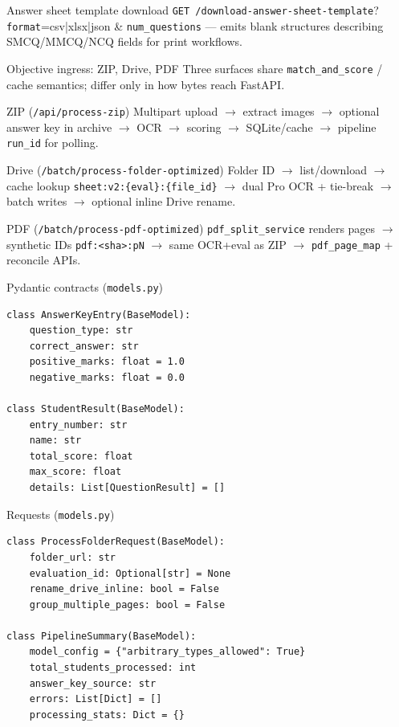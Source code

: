 \documentclass[aspectratio=169]{beamer}
\begin{document}
\begin{frame}{Answer sheet template download}
  \small
  \texttt{GET /download-answer-sheet-template}? \texttt{format}=csv|xlsx|json \& \texttt{num\_questions} --- emits blank structures describing SMCQ/MMCQ/NCQ fields for print workflows.
\end{frame}

\begin{frame}{Objective ingress: ZIP, Drive, PDF}
  \footnotesize
  Three surfaces share \texttt{match\_and\_score} / cache semantics; differ only in how bytes reach FastAPI.
\end{frame}

\begin{frame}{ZIP (\texttt{/api/process-zip})}
  \footnotesize
  Multipart upload $\rightarrow$ extract images $\rightarrow$ optional answer key in archive $\rightarrow$ OCR $\rightarrow$ scoring $\rightarrow$ SQLite/cache $\rightarrow$ pipeline \texttt{run\_id} for polling.
\end{frame}

\begin{frame}{Drive (\texttt{/batch/process-folder-optimized})}
  \footnotesize
  Folder ID $\rightarrow$ list/download $\rightarrow$ cache lookup \texttt{sheet:v2:\{eval\}:\{file\_id\}} $\rightarrow$ dual Pro OCR + tie-break $\rightarrow$ batch writes $\rightarrow$ optional inline Drive rename.
\end{frame}

\begin{frame}{PDF (\texttt{/batch/process-pdf-optimized})}
  \footnotesize
  \texttt{pdf\_split\_service} renders pages $\rightarrow$ synthetic IDs \texttt{pdf:<sha>:pN} $\rightarrow$ same OCR+eval as ZIP $\rightarrow$ \texttt{pdf\_page\_map} + reconcile APIs.
\end{frame}

\begin{frame}[fragile]{Pydantic contracts (\texttt{models.py})}
\begin{lstlisting}[style=py]
class AnswerKeyEntry(BaseModel):
    question_type: str
    correct_answer: str
    positive_marks: float = 1.0
    negative_marks: float = 0.0

class StudentResult(BaseModel):
    entry_number: str
    name: str
    total_score: float
    max_score: float
    details: List[QuestionResult] = []
\end{lstlisting}
\end{frame}

\begin{frame}[fragile]{Requests (\texttt{models.py})}
\begin{lstlisting}[style=py]
class ProcessFolderRequest(BaseModel):
    folder_url: str
    evaluation_id: Optional[str] = None
    rename_drive_inline: bool = False
    group_multiple_pages: bool = False

class PipelineSummary(BaseModel):
    model_config = {"arbitrary_types_allowed": True}
    total_students_processed: int
    answer_key_source: str
    errors: List[Dict] = []
    processing_stats: Dict = {}
\end{lstlisting}
\end{frame}
\end{document}
